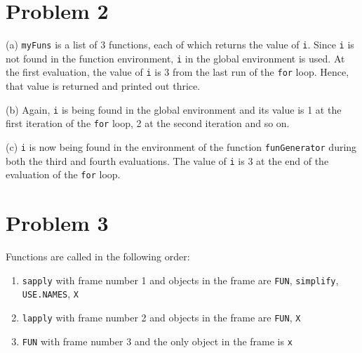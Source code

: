 \documentclass{article}\usepackage[]{graphicx}\usepackage[]{color}
\begin{document}
\section{Problem 2}
(a)
\texttt{myFuns} is a list of 3 functions, each of which returns the value of \texttt{i}. Since \texttt{i} is not found in the function environment, \texttt{i} in the global environment is used. At the first evaluation, the value of \texttt{i} is 3 from the last run of the \texttt{for} loop. Hence, that value is returned and printed out thrice.

(b)
Again, \texttt{i} is being found in the global environment and its value is 1 at the first iteration of the \texttt{for} loop, 2 at the second iteration and so on.

(c)
\texttt{i} is now being found in the environment of the function \texttt{funGenerator} during both the third and fourth evaluations. The value of \texttt{i} is 3 at the end of the evaluation of the \texttt{for} loop.
\section{Problem 3}
Functions are called in the following order:
\begin{enumerate}
  \item \texttt{sapply} with frame number 1 and objects in the frame are \texttt{FUN}, \texttt{simplify}, \texttt{USE.NAMES}, \texttt{X}
  \item \texttt{lapply} with frame number 2 and objects in the frame are \texttt{FUN}, \texttt{X}
  \item \texttt{FUN} with frame number 3 and the only object in the frame is \texttt{x}
\end{enumerate}
\end{document}
